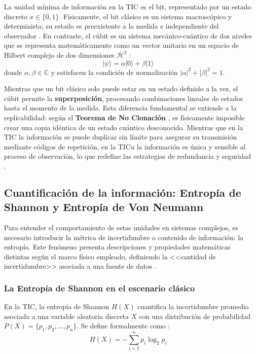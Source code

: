 \documentclass[11pt,a4paper,spanish]{book}
\begin{document}
La unidad mínima de información en la TIC es el bit, representado por un estado discreto $x \in \{0, 1\}$. Físicamente, el bit clásico es un sistema macroscópico y determinista; su estado es preexistente a la medida e independiente del observador \citep{cherry1952}. En contraste, el cúbit es un sistema mecánico-cuántico de dos niveles que se representa matemáticamente como un vector unitario en un espacio de Hilbert complejo de dos dimensiones $\mathcal{H}^2$ \citep{nielsen2010}:
\begin{equation}
    |\psi\rangle = \alpha|0\rangle + \beta|1\rangle
\end{equation}
donde $\alpha, \beta \in \mathbb{C}$ y satisfacen la condición de normalización $|\alpha|^2 + |\beta|^2 = 1$. 

Mientras que un bit clásico solo puede estar en un estado definido a la vez, el cúbit permite la \textbf{superposición}, procesando combinaciones lineales de estados hasta el momento de la medida. Esta diferencia fundamental se extiende a la replicabilidad: según el \textbf{Teorema de No Clonación} \citep{wootters1982}, es físicamente imposible crear una copia idéntica de un estado cuántico desconocido. Mientras que en la TIC la información se puede duplicar sin límite para asegurar su transmisión mediante códigos de repetición, en la TICu la información es única y sensible al proceso de observación, lo que redefine las estrategias de redundancia y seguridad \citep{bennett1993}.

\subsection{Cuantificación de la información: Entropía de Shannon y Entropía de Von Neumann}

Para entender el comportamiento de estas unidades en sistemas complejos, es necesario introducir la métrica de incertidumbre o contenido de información: la entropía. Este fenómeno presenta descripciones y propiedades matemáticas distintas según el marco físico empleado, definiendo la <<cantidad de incertidumbre>> asociada a una fuente de datos \citep{fano1961}.

\subsubsection{La Entropía de Shannon en el escenario clásico}

En la TIC, la entropía de Shannon $H(X)$ cuantifica la incertidumbre promedio asociada a una variable aleatoria discreta $X$ con una distribución de probabilidad $P(X) = \{p_1, p_2, \dots, p_n\}$. Se define formalmente como \citep{shannon1948}:
\begin{equation}
    H(X) = -\sum_{i=1}^{n} p_i \log_2 p_i
\end{equation}
\end{document}
